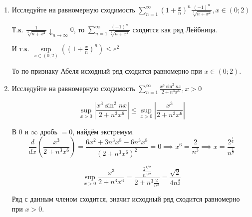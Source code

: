 \documentclass{article}
\begin{document}
\begin{large}
\begin{enumerate}
\item Исследуйте на равномерную сходимость $ \sum\limits_{n=1}^{\infty} \left( 1 + \frac{x}{n} \right)^n \frac{(-1)^n}{\sqrt[5]{n + x^2}}, x\in (0;2)  $

Т.к. $\frac{1}{\sqrt[5]{n + x^2}} \downarrow_{n\to\infty}0$, то $ \sum\limits_{n=1}^{\infty} \frac{(-1)^n}{\sqrt[5]{n + x^2}} $ сходится как ряд Лейбница.

И т.к. $ \sup\limits_{x\in(0;2)} \left( \left( 1 + \frac{x}{n} \right)^n \right) \leq e^2 $

То по признаку Абеля исходный ряд сходится равномерно при $x \in (0;2)$.

\item Исследуйте на равномерную сходимость $ \sum\limits_{n=1}^{\infty} \frac{x^3 \sin^2 nx}{2 + n^3x^6}, x > 0 $

$$ \sup_{x>0} \left| \frac{x^3 \sin^2 nx}{2 + n^3x^6} \right| \leq \sup_{x>0} \left| \frac{x^3}{2 + n^3x^6} \right| $$

В $0$ и $\infty$ дробь $= 0$, найдём экстремум.
$$ \frac{d}{dx} \left( \frac{x^3}{2 + n^3x^6} \right) = \frac{6x^2 + 3n^3x^8-6n^3x^8}{(2 + n^3x^6)^2} = 0 \implies x^6 = \frac{2}{n^3} \implies x = \frac{2^\frac{1}{6}}{n^\frac{1}{2}} $$

$$ \sup_{x>0} \frac{x^3}{2 + n^3x^6} = \frac{\frac{2^{1/2}}{n^{3/2}}}{2 + n^3 \frac{2}{n^3}} = \frac{\sqrt{2}}{4 n^\frac{3}{2}} $$

Ряд с данным членом сходится, значит исходный ряд сходится равномерно при $x > 0$.


\end{enumerate}
\end{large}
\end{document}
